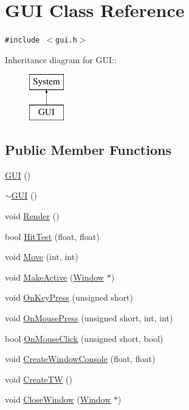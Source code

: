 \hypertarget{class_g_u_i}{
\section{GUI Class Reference}
\label{class_g_u_i}
}
{\tt \#include $<$gui.h$>$}

Inheritance diagram for GUI::\begin{figure}[H]
\begin{center}
\leavevmode
\includegraphics[height=2cm]{class_g_u_i}
\end{center}
\end{figure}
\subsection*{Public Member Functions}
\begin{CompactItemize}
\item 
\hyperlink{class_g_u_i_8cbb3140b7d3c9d8e942d6ce6b60a0e8}{GUI} ()
\item 
\hyperlink{class_g_u_i_c9cae2328dcb5d83bdfaeca49a2eb695}{$\sim$GUI} ()
\item 
void \hyperlink{class_g_u_i_4905ff37be14b83496d098096f5848b6}{Render} ()
\item 
bool \hyperlink{class_g_u_i_44bbc42e5bbf222e0a6241dc21e23703}{HitTest} (float, float)
\item 
void \hyperlink{class_g_u_i_27467859beafc23672cd8ac5dff5dd61}{Move} (int, int)
\item 
void \hyperlink{class_g_u_i_ce0821f8bd3d1cb8feafae68ea29dee6}{MakeActive} (\hyperlink{class_window}{Window} $\ast$)
\item 
void \hyperlink{class_g_u_i_a950cc3ec27839f6c06be8c4e0fe8c36}{OnKeyPress} (unsigned short)
\item 
void \hyperlink{class_g_u_i_10cc8065b91e81ee6c261529b41e7da8}{OnMousePress} (unsigned short, int, int)
\item 
bool \hyperlink{class_g_u_i_32678516005e48d6642f5c4b77441d09}{OnMouseClick} (unsigned short, bool)
\item 
void \hyperlink{class_g_u_i_d7b46be5b0f53a7bb0b118f8cc209829}{CreateWindowConsole} (float, float)
\item 
void \hyperlink{class_g_u_i_2f199fa669d2281e6af1b964dbb1a126}{CreateTW} ()
\item 
void \hyperlink{class_g_u_i_6312d42b33f2a747380e11b63c25e838}{CloseWindow} (\hyperlink{class_window}{Window} $\ast$)
\end{CompactItemize}
